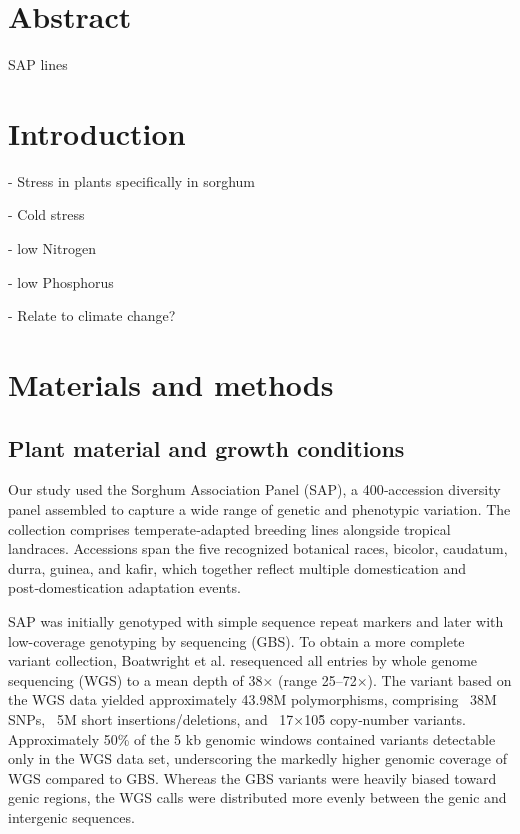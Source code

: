 \documentclass[10pt,letterpaper]{article}
\begin{document}
\section*{Abstract}
SAP lines



\linenumbers

\section*{Introduction}


- Stress in plants specifically in sorghum

- Cold stress

- low Nitrogen

- low Phosphorus

- Relate to climate change?


\section*{Materials and methods}

\subsection*{Plant material and growth conditions}
Our study used the Sorghum Association Panel (SAP), a 400‑accession diversity panel assembled to capture a wide range of genetic and phenotypic variation. The collection comprises temperate‑adapted breeding lines alongside tropical landraces. Accessions span the five recognized botanical races, bicolor, caudatum, durra, guinea, and kafir, which together reflect multiple domestication and post‑domestication adaptation events.

 SAP was initially genotyped with simple sequence repeat markers and later with low-coverage genotyping by sequencing (GBS). To obtain a more complete variant collection, Boatwright et al. resequenced all entries by whole genome sequencing (WGS) to a mean depth of 38× (range 25–72×). The variant based on the WGS data yielded approximately 43.98M polymorphisms, comprising ~38M SNPs, ~5M short insertions/deletions, and ~17×10\^5 copy‑number variants. Approximately 50\% of the 5 kb genomic windows contained variants detectable only in the WGS data set, underscoring the markedly higher genomic coverage of WGS compared to GBS. Whereas the GBS variants were heavily biased toward genic regions, the WGS calls were distributed more evenly between the genic and intergenic sequences.
\end{document}
